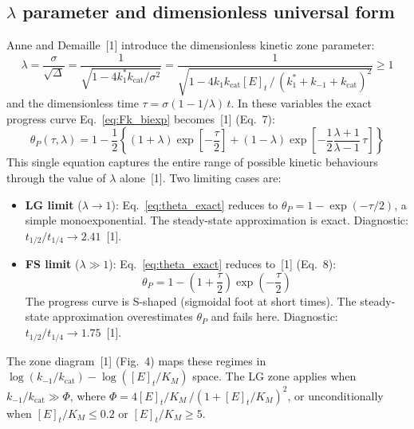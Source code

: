 \documentclass[10pt,a4paper]{article}
\numberwithin{equation}{section}
\newcommand{\cit}[1]{[#1]}
\newcommand{\kcat}{k_{\text{cat}}}
\begin{document}
\subsection{$\lambda$ parameter and dimensionless universal form}

Anne and Demaille~\cit{1} introduce the dimensionless kinetic zone parameter:
\begin{equation}
  \label{eq:lambda}
  \lambda = \frac{\sigma}{\sqrt{\Delta}}
  = \frac{1}{\sqrt{1 - 4k_1^*\kcat/\sigma^2}}
  = \frac{1}{\sqrt{1 - 4k_1\kcat[E]_t\,/\,(k_1^*+k_{-1}+\kcat)^2}}
  \geq 1
\end{equation}
and the dimensionless time $\tau = \sigma(1 - 1/\lambda)\,t$. In these variables the
exact progress curve Eq.~\eqref{eq:Fk_biexp} becomes~\cit{1} (Eq.~7):
\begin{equation}
  \label{eq:theta_exact}
  \theta_P(\tau,\lambda) = 1 - \frac{1}{2}\!\left\{
    (1+\lambda)\exp\!\left[-\frac{\tau}{2}\right]
    +(1-\lambda)\exp\!\left[-\frac{1}{2}\frac{\lambda+1}{\lambda-1}\,\tau\right]
  \right\}
\end{equation}
This single equation captures the entire range of possible kinetic behaviours
through the value of $\lambda$ alone~\cit{1}. Two limiting cases are:
\begin{itemize}[noitemsep]
  \item \textbf{LG limit} ($\lambda \to 1$): Eq.~\eqref{eq:theta_exact}
    reduces to $\theta_P = 1 - \exp(-\tau/2)$, a simple monoexponential.
    The steady-state approximation is exact.
    Diagnostic: $t_{1/2}/t_{1/4} \to 2.41$~\cit{1}.
  \item \textbf{FS limit} ($\lambda \gg 1$): Eq.~\eqref{eq:theta_exact}
    reduces to~\cit{1} (Eq.~8):
    \begin{equation}
      \label{eq:fs}
      \theta_P = 1 - \!\left(1 + \frac{\tau}{2}\right)\exp\!\left(-\frac{\tau}{2}\right)
    \end{equation}
    The progress curve is S-shaped (sigmoidal foot at short times).
    The steady-state approximation overestimates $\theta_P$ and fails here.
    Diagnostic: $t_{1/2}/t_{1/4} \to 1.75$~\cit{1}.
\end{itemize}
The zone diagram~\cit{1} (Fig.~4) maps these regimes in
$\log(k_{-1}/\kcat) - \log([E]_t/K_M)$ space. The LG zone applies when
$k_{-1}/\kcat \gg \Phi$, where $\Phi = 4[E]_t/K_M\,/(1+[E]_t/K_M)^2$, or
unconditionally when $[E]_t/K_M \leq 0.2$ or $[E]_t/K_M \geq 5$.

\end{document}

